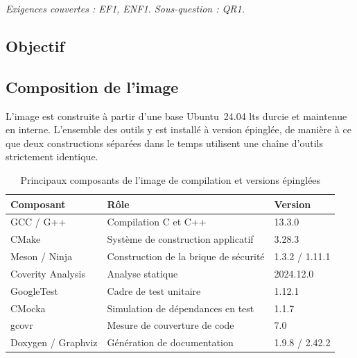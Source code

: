 \emph{Exigences couvertes : EF1, ENF1. Sous-question : QR1.}

\subsection{Objectif}

\subsection{Composition de l'image}

L'image est construite à partir d'une base Ubuntu~24.04 \gls{lts} durcie et
maintenue en interne. L'ensemble des outils y est installé à version épinglée,
de manière à ce que deux constructions séparées dans le temps utilisent une
chaîne d'outils strictement identique.

\begin{table}[H]
\centering
\caption{Principaux composants de l'image de compilation et versions épinglées}
\label{tab:impl-image-versions}
\begin{tabularx}{\textwidth}{@{}l X l@{}}
\toprule
\textbf{Composant} & \textbf{Rôle} & \textbf{Version} \\
\midrule
GCC / G++ & Compilation C et C++ & 13.3.0 \\
CMake & Système de construction applicatif & 3.28.3 \\
Meson / Ninja & Construction de la brique de sécurité & 1.3.2 / 1.11.1 \\
Coverity Analysis & Analyse statique & 2024.12.0 \\
GoogleTest & Cadre de test unitaire & 1.12.1 \\
CMocka & Simulation de dépendances en test & 1.1.7 \\
gcovr & Mesure de couverture de code & 7.0 \\
Doxygen / Graphviz & Génération de documentation & 1.9.8 / 2.42.2 \\
\bottomrule
\end{tabularx}
\end{table}


